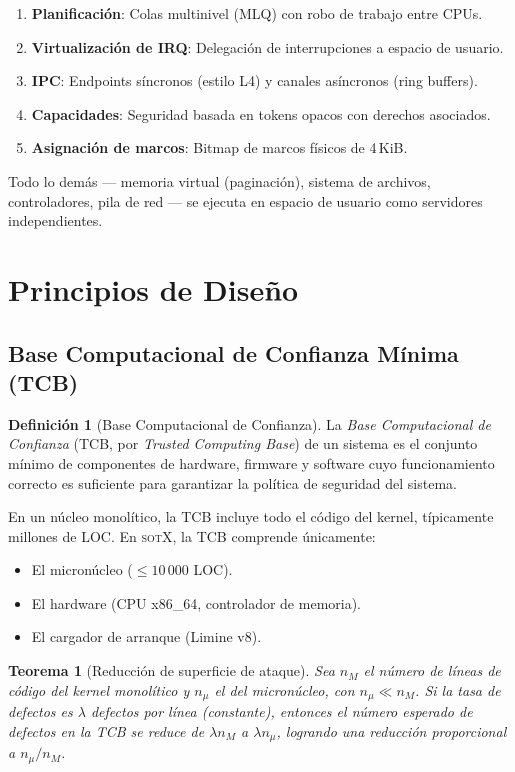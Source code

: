 \documentclass[11pt,twoside,openright]{book}
\theoremstyle{definition}
\newtheorem{definition}{Definición}[chapter]
\theoremstyle{plain}
\newtheorem{theorem}{Teorema}[chapter]
\theoremstyle{remark}
\newcommand{\sotos}{\textsc{sotX}}
\begin{document}
\begin{enumerate}
    \item \textbf{Planificación}: Colas multinivel (MLQ) con robo de trabajo entre CPUs.
    \item \textbf{Virtualización de IRQ}: Delegación de interrupciones a espacio de usuario.
    \item \textbf{IPC}: Endpoints síncronos (estilo L4) y canales asíncronos (ring buffers).
    \item \textbf{Capacidades}: Seguridad basada en tokens opacos con derechos asociados.
    \item \textbf{Asignación de marcos}: Bitmap de marcos físicos de 4\,KiB.
\end{enumerate}

Todo lo demás --- memoria virtual (paginación), sistema de archivos, controladores,
pila de red --- se ejecuta en espacio de usuario como servidores independientes.

\section{Principios de Diseño}

\subsection{Base Computacional de Confianza Mínima (TCB)}

\begin{definition}[Base Computacional de Confianza]
\label{def:tcb}
La \emph{Base Computacional de Confianza} (TCB, por \emph{Trusted Computing Base}) de un
sistema es el conjunto mínimo de componentes de hardware, firmware y software cuyo
funcionamiento correcto es suficiente para garantizar la política de seguridad del sistema.
\end{definition}

En un núcleo monolítico, la TCB incluye todo el código del kernel, típicamente millones
de LOC. En \sotos{}, la TCB comprende únicamente:

\begin{itemize}
    \item El micronúcleo ($\leq 10\,000$ LOC).
    \item El hardware (CPU x86\_64, controlador de memoria).
    \item El cargador de arranque (Limine v8).
\end{itemize}

\begin{theorem}[Reducción de superficie de ataque]
\label{thm:tcb-reduction}
Sea $n_M$ el número de líneas de código del kernel monolítico y $n_\mu$ el del micronúcleo,
con $n_\mu \ll n_M$. Si la tasa de defectos es $\lambda$ defectos por línea (constante),
entonces el número esperado de defectos en la TCB se reduce de $\lambda n_M$ a
$\lambda n_\mu$, logrando una reducción proporcional a $n_\mu / n_M$.
\end{theorem}
\end{document}
